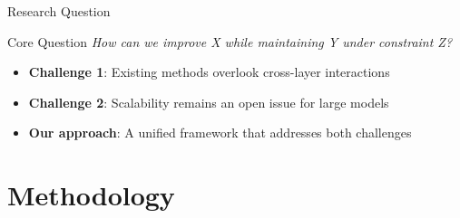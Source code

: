 \documentclass{beamer}
\begin{document}
\begin{frame}{Research Question}
    \begin{block}{Core Question}
        \centering
        \large \textit{How can we improve X while maintaining Y under constraint Z?}
    \end{block}
    \vspace{0.4cm}
    \begin{itemize}
        \setlength{\itemsep}{0.7em}
        \item \textcolor{ECNURed}{\textbf{Challenge 1}}: Existing methods overlook cross-layer interactions
        \item \textcolor{ECNURed}{\textbf{Challenge 2}}: Scalability remains an open issue for large models
        \item \textcolor{ECNURed}{\textbf{Our approach}}: A unified framework that addresses both challenges
    \end{itemize}
\end{frame}

\section[Methodology]{Methodology}
\end{document}
